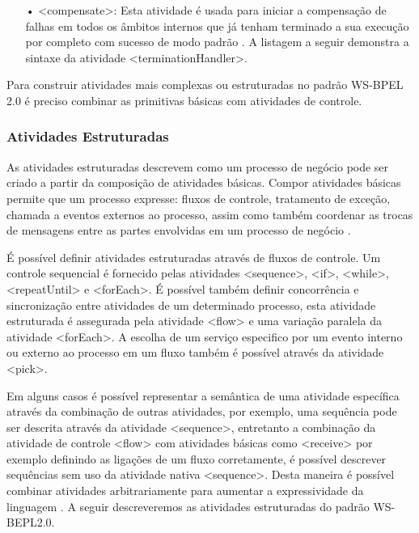 \begin{itemize}
%

\item[•] <compensate>: Esta atividade é usada para iniciar a compensação de falhas em todos os âmbitos internos que já tenham terminado a sua execução por completo com sucesso de modo padrão \cite{BPEL20}. A listagem a seguir demonstra a sintaxe da atividade <terminationHandler>.

%

\end{itemize}

Para construir atividades mais complexas ou estruturadas no padrão WS-BPEL 2.0 é preciso combinar as primitivas básicas com atividades de controle. 

\subsubsection{Atividades Estruturadas}

As atividades estruturadas descrevem como um processo de negócio pode ser criado a partir da composição de atividades básicas. Compor atividades básicas permite que um processo expresse: fluxos de controle, tratamento de exceção, chamada a eventos externos ao processo, assim como também coordenar as trocas de mensagens entre as partes envolvidas em um processo de negócio \cite{BPEL20}.

É possível definir atividades estruturadas através de fluxos de controle. Um controle sequencial é fornecido pelas atividades <sequence>, <if>, <while>, <repeatUntil> e <forEach>. É possível também definir concorrência e sincronização entre atividades de um determinado processo, esta atividade estruturada é assegurada pela atividade <flow> e uma variação paralela da atividade <forEach>. A escolha de um serviço especifico por um evento interno ou externo ao processo em um fluxo também é possível através da atividade <pick>.

Em alguns casos é possível representar a semântica de uma atividade específica através da combinação de outras atividades, por exemplo, uma sequência pode ser descrita através da atividade <sequence>, entretanto a combinação da atividade de controle <flow> com atividades básicas como <receive> por exemplo definindo as ligações de um fluxo corretamente, é possível descrever sequências sem uso da atividade nativa <sequence>. Desta maneira é possível combinar atividades arbitrariamente para aumentar a expressividade da linguagem \cite{BPEL20}. A seguir descreveremos as atividades estruturadas do padrão WS-BEPL2.0.

